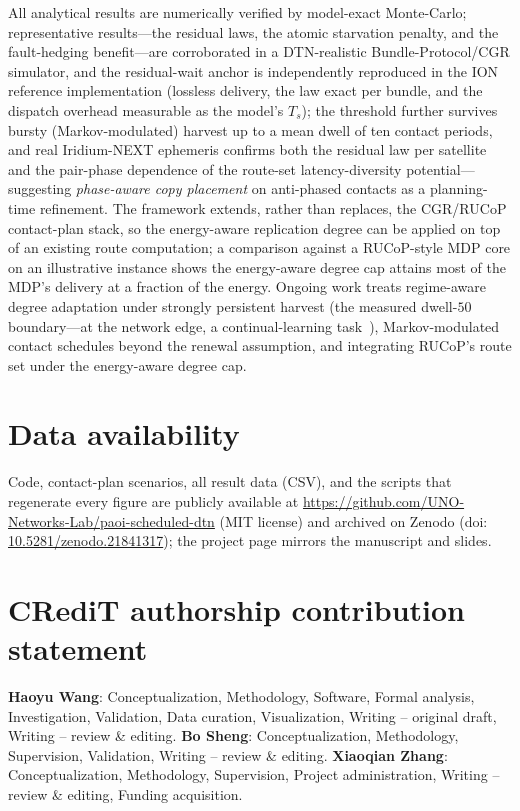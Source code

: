 \documentclass[twocolumn,3p,times,procedia]{elsarticle}
\begin{document}
All analytical results are numerically verified by model-exact
Monte-Carlo;
representative results---the residual laws, the atomic starvation
penalty, and the fault-hedging benefit---are
corroborated in a
DTN-realistic Bundle-Protocol/CGR simulator, and the residual-wait
anchor is independently reproduced in the ION reference implementation
(lossless
delivery, the law exact per bundle, and the dispatch overhead measurable
as the model's $T_s$); the threshold
further survives bursty (Markov-modulated) harvest up to a mean dwell of
ten contact periods, and real Iridium-NEXT ephemeris confirms both the
residual law per satellite and the pair-phase dependence of the
route-set latency-diversity potential---suggesting \emph{phase-aware
copy placement} on
anti-phased contacts as a planning-time refinement. The framework
extends, rather than replaces, the CGR/RUCoP contact-plan stack, so the
energy-aware replication degree can be applied on top of an existing
route computation; a comparison against a RUCoP-style MDP core on an
illustrative instance shows the energy-aware degree cap attains most of
the MDP's delivery at a fraction of the energy. Ongoing work treats
regime-aware degree adaptation under strongly persistent harvest (the
measured dwell-$50$ boundary---at the network edge, a continual-learning
task~\cite{wu2026tnse}), Markov-modulated contact schedules
beyond the renewal assumption, and integrating
RUCoP's route set under the energy-aware degree cap.

\section*{Data availability}
Code, contact-plan scenarios, all result data (CSV), and the scripts
that regenerate every figure are publicly available at
\url{https://github.com/UNO-Networks-Lab/paoi-scheduled-dtn} (MIT license) and
archived on Zenodo (doi:\allowbreak
\url{10.5281/zenodo.21841317}); the
project page mirrors the manuscript and slides.

\section*{CRediT authorship contribution statement}
\textbf{Haoyu Wang}: Conceptualization, Methodology, Software, Formal
analysis, Investigation, Validation, Data curation, Visualization,
Writing -- original draft, Writing -- review \& editing.
\textbf{Bo Sheng}: Conceptualization, Methodology, Supervision,
Validation, Writing -- review \& editing.
\textbf{Xiaoqian Zhang}: Conceptualization, Methodology, Supervision,
Project administration, Writing -- review \& editing, Funding
acquisition.
\end{document}

